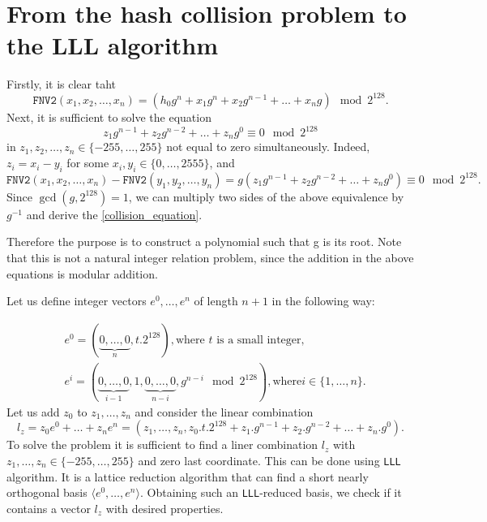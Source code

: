 \documentclass{iacrtrans}
\begin{document}
\section{From the hash collision problem to the LLL algorithm}
Firstly, it is clear taht
\begin{equation*}
\texttt{FNV2}(x_{1}, x_{2}, \ldots, x_{n}) = (h_{0}g^{n} + x_{1}g^{n} + x_{2}g^{n-1} + \ldots + x_{n}g) \mod 2^{128}.
\end{equation*}
Next, it is sufficient to solve the equation
\begin{equation}
\label{collision_equation}
z_{1}g^{n - 1} + z_{2}g^{n - 2} + \ldots + z_{n}g^{0} \equiv 0 \mod 2^{128}
\end{equation}
in $z_{1}, z_{2}, \ldots, z_{n}\in \{-255,\ldots, 255\}$ not equal to zero  simultaneously. Indeed, $z_{i} = x_{i} - y_{i}$ for some $x_{i}, y_{i}\in \{0, \ldots, 2555\}$, and 
\begin{equation*}
\texttt{FNV2}(x_{1}, x_{2}, \ldots, x_{n}) - \texttt{FNV2}(y_{1}, y_{2}, \ldots, y_{n}) = g(z_{1}g^{n-1} + z_{2}g^{n-2} + \ldots + z_{n}g^{0}) \equiv 0 \mod 2^{128}. 
\end{equation*}
Since $\gcd(g, 2^{128}) = 1$, we can multiply two sides of the above equivalence by $g^{-1}$ and derive the \ref{collision_equation}. 

Therefore the purpose is to construct a polynomial such that g is its root. Note that this is not a natural integer relation problem, since the addition in the above equations is modular addition. 

Let us define integer vectors $e^{0}, \ldots, e^{n}$ of length $n + 1$ in the following way:

\begin{align*}
&
e^{0} = (\underbrace{0, \ldots, 0}_{n}, t.2^{128}), \text{where $t$ is a small integer},\\
&e^{i} = (\underbrace{0, \ldots, 0}_{i-1}, 1, \underbrace{0, \ldots, 0}_{n-i}, g^{n - i} \mod 2^{128}), \text{where} i \in \{1, \ldots, n\}.
\end{align*}
Let us add $z_{0}$ to $z_{1}, \ldots, z_{n}$ and consider the linear combination
\begin{equation*}
l_{z} = z_{0}e^{0} + \ldots + z_{n}e^{n} = (z_{1}, \ldots, z_{n}, z_{0}.t.2^{128} + z_{1}.g^{n-1} + z_{2}.g^{n-2} + \ldots + z_{n}.g^{0}).
\end{equation*}
To solve the problem it is sufficient to find a liner combination $l_{z}$ with $z_{1}, \ldots, z_{n}\in \{-255, \ldots, 255\}$ and zero last coordinate. This can be done using \texttt{LLL} algorithm. It is a lattice reduction algorithm that can find a short nearly orthogonal basis $\langle e^{0}, \ldots, e^{n} \rangle$. Obtaining such an \texttt{LLL}-reduced basis, we check if it contains a vector $l_{z}$ with desired properties\cite{gorodilova2018problems}.

{}

\end{document}
